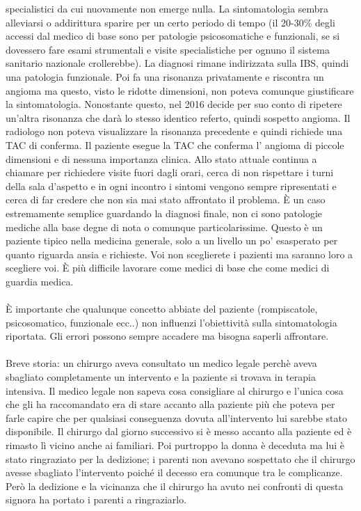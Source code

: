 specialistici da cui nuovamente non emerge nulla. La sintomatologia
sembra alleviarsi o addirittura sparire per un certo periodo di tempo
(il 20-30\% degli accessi dal medico di base sono per patologie
psicosomatiche e funzionali, se si dovessero fare esami strumentali e
visite specialistiche per ognuno il sistema sanitario nazionale
crollerebbe). La diagnosi rimane indirizzata sulla IBS, quindi una
patologia funzionale. Poi fa una risonanza privatamente e riscontra un
angioma ma questo, visto le ridotte dimensioni, non poteva comunque
giustificare la sintomatologia. Nonostante questo, nel 2016 decide per
suo conto di ripetere un'altra risonanza che darà lo stesso identico
referto, quindi sospetto angioma. Il radiologo non poteva visualizzare
la risonanza precedente e quindi richiede una TAC di conferma. Il
paziente esegue la TAC che conferma l' angioma di piccole dimensioni e
di nessuna importanza clinica. Allo stato attuale continua a chiamare
per richiedere visite fuori dagli orari, cerca di non rispettare i turni
della sala d'aspetto e in ogni incontro i sintomi vengono sempre
ripresentati e cerca di far credere che non sia mai stato affrontato il
problema. È un caso estremamente semplice guardando la diagnosi finale,
non ci sono patologie mediche alla base degne di nota o comunque
particolarissime. Questo è un paziente tipico nella medicina generale,
solo a un livello un po' esasperato per quanto riguarda ansia e
richieste. Voi non sceglierete i pazienti ma saranno loro a scegliere
voi. È più difficile lavorare come medici di base che come medici di
guardia medica.
\\\\
È importante che qualunque concetto abbiate del paziente (rompiscatole,
psicosomatico, funzionale ecc..) non influenzi l'obiettività sulla
sintomatologia riportata. Gli errori possono sempre accadere ma bisogna
saperli affrontare.
\\\\
Breve storia: un chirurgo aveva consultato un medico legale perchè aveva
sbagliato completamente un intervento e la paziente si trovava in
terapia intensiva. Il medico legale non sapeva cosa consigliare al
chirurgo e l'unica cosa che gli ha raccomandato era di stare accanto
alla paziente più che poteva per farle capire che per qualsiasi
conseguenza dovuta all'intervento lui sarebbe stato disponibile. Il
chirurgo dal giorno successivo si è messo accanto alla paziente ed è
rimasto lì vicino anche ai familiari. Poi purtroppo la donna è deceduta
ma lui è stato ringraziato per la dedizione; i parenti non avevano
sospettato che il chirurgo avesse sbagliato l'intervento poiché il
decesso era comunque tra le complicanze. Però la dedizione e la
vicinanza che il chirurgo ha avuto nei confronti di questa signora ha
portato i parenti a ringraziarlo.

